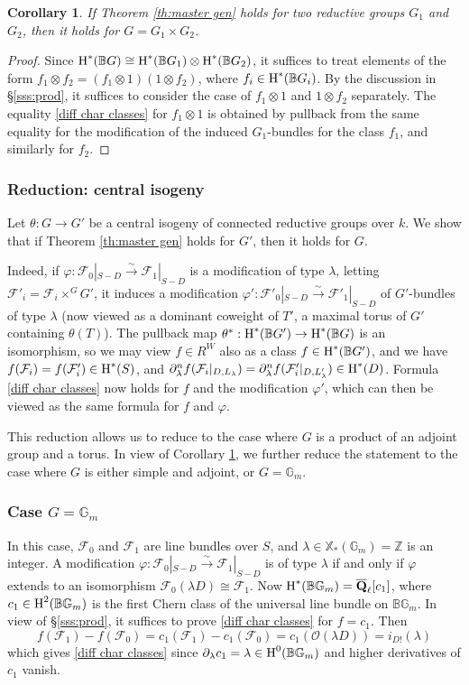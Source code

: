 \documentclass[reqno]{amsart}
\numberwithin{equation}{subsection}
\newtheorem{cor}[subsubsection]{Corollary}
\theoremstyle{definition}
\def\BB{\mathbb{B}}
\def\GG{\mathbb{G}}
\def\ZZ{\mathbb{Z}}
\newcommand\cF{\mathcal{F}}
\newcommand\cO{\mathcal{O}}
\newcommand{\Gm}{\GG_m}
\newcommand\xcoch{\mathbb{X}_*}
\newcommand{\Qlbar}{\overline{\Q}_\ell}
\newcommand\ot{\otimes}
\newcommand{\cohog}[2]{\textup{H}^{#1}({#2})}     %
\newcommand{\isom}{\stackrel{\sim}{\to}}
\renewcommand{\th}{\theta}
\newcommand{\ph}{\varphi}
\renewcommand{\l}{\lambda}
\newcommand\pl{\partial}
\newcommand{\Q}{\mathbf{Q}}
\begin{document}
\begin{cor}\label{c:prod} If Theorem \ref{th:master gen} holds for two reductive groups $G_{1}$ and $G_{2}$, then it holds for $G=G_{1}\times G_{2}$. 
\end{cor}
\begin{proof} Since $\cohog{*}{\BB G}\cong \cohog{*}{\BB G_{1}}\ot \cohog{*}{\BB G_{2}}$, it suffices to treat elements of the form $f_{1}\ot f_{2}=(f_{1}\ot 1) (1\ot f_{2})$, where $f_{i}\in\cohog{*}{\BB G_{i}}$. By the discussion in \S\ref{sss:prod}, it suffices to consider the case of $f_{1}\ot 1$ and $1\ot f_{2}$ separately. The equality \eqref{diff char classes} for $f_{1}\ot 1$ is obtained by pullback from the same equality for the modification of the induced $G_{1}$-bundles for the class $f_{1}$, and similarly for $f_2$. 
\end{proof}

\subsubsection{Reduction: central isogeny}
Let $\th: G\to  G'$ be a central isogeny of connected reductive groups over $k$. We show that if Theorem \ref{th:master gen} holds for $G'$, then it holds for $G$. 

Indeed, if $\ph: \cF_{0}|_{S-D}\isom \cF_{1}|_{S-D}$ is a modification of type $\l$, letting $\cF'_{i}=\cF_{i}\times^{G}G'$, it induces a modification $\ph': \cF'_{0}|_{S-D}\isom \cF'_{1}|_{S-D}$ of $G'$-bundles of type $\l$ (now viewed as a dominant coweight of $T'$, a maximal torus of $G'$ containing $\th(T)$). The pullback map $\th^{*}: \cohog{*}{\BB G'}\to \cohog{*}{\BB G}$ is an isomorphism, so we may view $f\in R^{W}$ also as a class  $f\in \cohog{*}{\BB G'}$, and we have $f(\cF_{i})=f(\cF'_{i})\in \cohog{*}{S}$, and $\pl^{n}_{\l}f(\cF_{i}|_{D,L_{\l}})=\pl^{n}_{\l}f(\cF'_{i}|_{D,L'_{\l}})\in \cohog{*}{D}$. Formula \eqref{diff char classes} now holds for $f$ and the modification $\ph'$, which can then be viewed as the same formula for $f$ and $\ph$. 


This reduction allows us to reduce to the case where $G$ is a product of an adjoint group and a torus. In view of Corollary \ref{c:prod}, we further reduce the statement to the case where $G$ is either simple and adjoint, or $G=\Gm $.

\subsubsection{Case $G = \Gm$}\label{sss:master Gm}
In this case, $\cF_{0}$ and $\cF_{1}$ are line bundles over $S$, and $\l\in \xcoch(\Gm)=\ZZ$ is an integer. A modification $\ph: \cF_{0}|_{S-D}\isom \cF_{1}|_{S-D}$ is of type $\l$ if and only if $\ph$ extends to an isomorphism $\cF_{0}(\l D) \cong \cF_{1}$. Now $\cohog{*}{\BB\Gm}=\Qlbar[c_1]$, where $c_1\in \cohog{2}{\BB\Gm}$ is the first Chern class of the universal line bundle on $\BB\Gm$. In view of \S\ref{sss:prod}, it suffices to prove \eqref{diff char classes} for $f=c_1$. Then 
$$f(\cF_{1})-f(\cF_{0})=c_{1}(\cF_{1})-c_{1}(\cF_{0})=c_{1}(\cO(\l D))=i_{D!}(\l)$$
which gives \eqref{diff char classes} since $\pl_{\l}c_1 =\l\in \cohog{0}{\BB\Gm}$ and higher derivatives of $c_1$ vanish.
\end{document}
